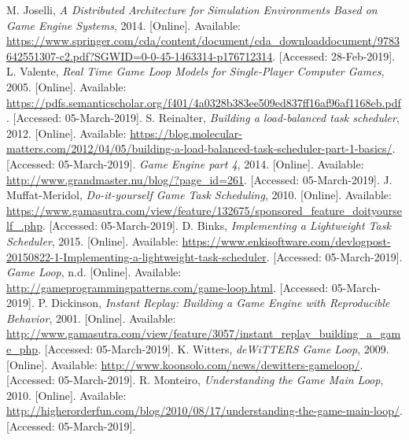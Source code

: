 \documentclass[a4paper, 12pt]{article}
\begin{document}
    \begin{thebibliography}{9}
            M. Joselli, \textit{A Distributed Architecture for Simulation Environments Based on Game Engine Systems}, 2014. [Online]. Available: \url{https://www.springer.com/cda/content/document/cda_downloaddocument/9783642551307-c2.pdf?SGWID=0-0-45-1463314-p176712314}. [Accessed: 28-Feb-2019].
            L. Valente, \textit{Real Time Game Loop Models for Single-Player Computer Games}, 2005. [Online]. Available: \url{https://pdfs.semanticscholar.org/f401/4a0328b383ee509ed837ff16af96af1168eb.pdf}. [Accessed: 05-March-2019].
            S. Reinalter, \textit{Building a load-balanced task scheduler}, 2012. [Online]. Available: \url{https://blog.molecular-matters.com/2012/04/05/building-a-load-balanced-task-scheduler-part-1-basics/}. [Accessed: 05-March-2019].
            \textit{Game Engine part 4}, 2014. [Online]. Available: \url{http://www.grandmaster.nu/blog/?page_id=261}. [Accessed: 05-March-2019].
            J. Muffat-Meridol, \textit{Do-it-yourself Game Task Scheduling}, 2010. [Online]. Available: \url{https://www.gamasutra.com/view/feature/132675/sponsored_feature_doityourself_.php}. [Accessed: 05-March-2019].
        \bibitem{}
            D. Binks, \textit{Implementing a Lightweight Task Scheduler}, 2015. [Online]. Available: \url{https://www.enkisoftware.com/devlogpost-20150822-1-Implementing-a-lightweight-task-scheduler}. [Accessed: 05-March-2019].
        \bibitem{}
            \textit{Game Loop}, n.d. [Online]. Available: \url{http://gameprogrammingpatterns.com/game-loop.html}. [Accessed: 05-March-2019].
        \bibitem{}
            P. Dickinson, \textit{Instant Replay: Building a Game Engine with Reproducible Behavior}, 2001. [Online]. Available: \url{http://www.gamasutra.com/view/feature/3057/instant_replay_building_a_game_php}. [Accessed: 05-March-2019].
        \bibitem{}
            K. Witters, \textit{deWiTTERS Game Loop}, 2009. [Online]. Available: \url{http://www.koonsolo.com/news/dewitters-gameloop/}. [Accessed: 05-March-2019].
        \bibitem{}
            R. Monteiro, \textit{Understanding the Game Main Loop}, 2010. [Online]. Available: \url{http://higherorderfun.com/blog/2010/08/17/understanding-the-game-main-loop/}. [Accessed: 05-March-2019].
    \end{thebibliography}

\newpage



\end{document}
